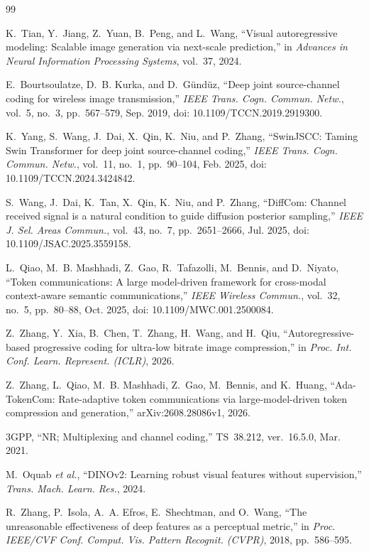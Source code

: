 \begin{thebibliography}{99}

K.~Tian, Y.~Jiang, Z.~Yuan, B.~Peng, and L.~Wang, ``Visual autoregressive modeling: Scalable image generation via next-scale prediction,'' in \emph{Advances in Neural Information Processing Systems}, vol.~37, 2024.

E.~Bourtsoulatze, D.~B. Kurka, and D.~G\"und\"uz, ``Deep joint source-channel coding for wireless image transmission,'' \emph{IEEE Trans. Cogn. Commun. Netw.}, vol.~5, no.~3, pp.~567--579, Sep. 2019, doi: 10.1109/TCCN.2019.2919300.

K.~Yang, S.~Wang, J.~Dai, X.~Qin, K.~Niu, and P.~Zhang, ``SwinJSCC: Taming Swin Transformer for deep joint source-channel coding,'' \emph{IEEE Trans. Cogn. Commun. Netw.}, vol.~11, no.~1, pp.~90--104, Feb. 2025, doi: 10.1109/TCCN.2024.3424842.

S.~Wang, J.~Dai, K.~Tan, X.~Qin, K.~Niu, and P.~Zhang, ``DiffCom: Channel received signal is a natural condition to guide diffusion posterior sampling,'' \emph{IEEE J. Sel. Areas Commun.}, vol.~43, no.~7, pp.~2651--2666, Jul. 2025, doi: 10.1109/JSAC.2025.3559158.

L.~Qiao, M.~B. Mashhadi, Z.~Gao, R.~Tafazolli, M.~Bennis, and D.~Niyato, ``Token communications: A large model-driven framework for cross-modal context-aware semantic communications,'' \emph{IEEE Wireless Commun.}, vol.~32, no.~5, pp.~80--88, Oct. 2025, doi: 10.1109/MWC.001.2500084.

Z.~Zhang, Y.~Xia, B.~Chen, T.~Zhang, H.~Wang, and H.~Qiu, ``Autoregressive-based progressive coding for ultra-low bitrate image compression,'' in \emph{Proc. Int. Conf. Learn. Represent. (ICLR)}, 2026.

Z.~Zhang, L.~Qiao, M.~B. Mashhadi, Z.~Gao, M.~Bennis, and K.~Huang, ``Ada-TokenCom: Rate-adaptive token communications via large-model-driven token compression and generation,'' arXiv:2608.28086v1, 2026.

3GPP, ``NR; Multiplexing and channel coding,'' TS~38.212, ver.~16.5.0, Mar. 2021.

M.~Oquab \emph{et al.}, ``DINOv2: Learning robust visual features without supervision,'' \emph{Trans. Mach. Learn. Res.}, 2024.

R.~Zhang, P.~Isola, A.~A. Efros, E.~Shechtman, and O.~Wang, ``The unreasonable effectiveness of deep features as a perceptual metric,'' in \emph{Proc. IEEE/CVF Conf. Comput. Vis. Pattern Recognit. (CVPR)}, 2018, pp.~586--595.


\end{thebibliography}
